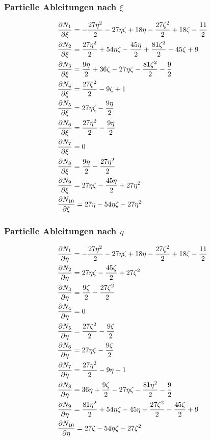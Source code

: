 \begin{minipage}[t]{0.45\textwidth}

\subsubsection{Partielle Ableitungen nach $\xi$}
\begin{align*}
&\frac{\partial N_1}{\partial \xi} = -\frac{27\eta ^2}{2}-27\eta \zeta+18\eta -\frac{27{\zeta}^2}{2}+18\zeta-\frac{11}{2}\\
&\frac{\partial N_2}{\partial \xi} = \frac{27\eta ^2}{2}+54\eta \zeta-\frac{45\eta }{2}+\frac{81{\zeta}^2}{2}-45\zeta+9\\
&\frac{\partial N_3}{\partial \xi} = \frac{9\eta }{2}+36\zeta-27\eta \zeta-\frac{81{\zeta}^2}{2}-\frac{9}{2}\\
&\frac{\partial N_4}{\partial \xi} = \frac{27{\zeta}^2}{2}-9\zeta+1\\
&\frac{\partial N_5}{\partial \xi} = 27\eta \zeta-\frac{9\eta }{2}\\
&\frac{\partial N_6}{\partial \xi} = \frac{27\eta ^2}{2}-\frac{9\eta }{2}\\
&\frac{\partial N_7}{\partial \xi} = 0\\
&\frac{\partial N_8}{\partial \xi} = \frac{9\eta }{2}-\frac{27\eta ^2}{2}\\
&\frac{\partial N_9}{\partial \xi} = 27\eta \zeta-\frac{45\eta }{2}+27\eta ^2\\
&\frac{\partial N_{10}}{\partial \xi} = 27\eta -54\eta \zeta-27\eta ^2\\
\end{align*}
\end{minipage}
\hspace{5mm}
\begin{minipage}[t]{0.45\textwidth}
\subsubsection{Partielle Ableitungen nach $\eta$}
\begin{align*}
&\frac{\partial N_1}{\partial \eta} = -\frac{27\eta ^2}{2}-27\eta \zeta+18\eta -\frac{27{\zeta}^2}{2}+18\zeta-\frac{11}{2}\\
&\frac{\partial N_2}{\partial \eta} = 27\eta \zeta-\frac{45\zeta}{2}+27{\zeta}^2\\
&\frac{\partial N_3}{\partial \eta} = \frac{9\zeta}{2}-\frac{27{\zeta}^2}{2}\\
&\frac{\partial N_4}{\partial \eta} = 0\\
&\frac{\partial N_5}{\partial \eta} = \frac{27{\zeta}^2}{2}-\frac{9\zeta}{2}\\
&\frac{\partial N_6}{\partial \eta} = 27\eta \zeta-\frac{9\zeta}{2}\\
&\frac{\partial N_7}{\partial \eta} = \frac{27\eta ^2}{2}-9\eta +1\\
&\frac{\partial N_8}{\partial \eta} = 36\eta +\frac{9\zeta}{2}-27\eta \zeta-\frac{81\eta ^2}{2}-\frac{9}{2}\\
&\frac{\partial N_9}{\partial \eta} = \frac{81\eta ^2}{2}+54\eta \zeta-45\eta +\frac{27{\zeta}^2}{2}-\frac{45\zeta}{2}+9\\
&\frac{\partial N_{10}}{\partial \eta} = 27\zeta-54\eta \zeta-27{\zeta}^2\\
\end{align*}
\end{minipage}
